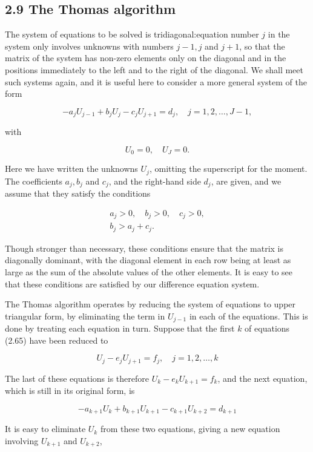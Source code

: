 \documentclass[10pt]{article}
\begin{document}
\subsection*{2.9 The Thomas algorithm}
The system of equations to be solved is tridiagonal:equation number \(j\) in the system only involves unknowns with numbers \(j-1, j\) and \(j+1\), so that the matrix of the system has non-zero elements only on the diagonal and in the positions immediately to the left and to the right of the diagonal. We shall meet such systems again, and it is useful here to consider a more general system of the form

\[
-a_{j} U_{j-1}+b_{j} U_{j}-c_{j} U_{j+1}=d_{j}, \quad j=1,2, \ldots, J-1,
\]

with

\[
U_{0}=0, \quad U_{J}=0 .
\]

Here we have written the unknowns \(U_{j}\), omitting the superscript for the moment. The coefficients \(a_{j}, b_{j}\) and \(c_{j}\), and the right-hand side \(d_{j}\), are given, and we assume that they satisfy the conditions

\[
\begin{gathered}
a_{j}>0, \quad b_{j}>0, \quad c_{j}>0, \\
b_{j}>a_{j}+c_{j} .
\end{gathered}
\]

Though stronger than necessary, these conditions ensure that the matrix is diagonally dominant, with the diagonal element in each row being at least as large as the sum of the absolute values of the other elements. It is easy to see that these conditions are satisfied by our difference equation system.

The Thomas algorithm operates by reducing the system of equations to upper triangular form, by eliminating the term in \(U_{j-1}\) in each of the equations. This is done by treating each equation in turn. Suppose that the first \(k\) of equations (2.65) have been reduced to

\[
U_{j}-e_{j} U_{j+1}=f_{j}, \quad j=1,2, \ldots, k
\]

The last of these equations is therefore \(U_{k}-e_{k} U_{k+1}=f_{k}\), and the next equation, which is still in its original form, is

\[
-a_{k+1} U_{k}+b_{k+1} U_{k+1}-c_{k+1} U_{k+2}=d_{k+1}
\]

It is easy to eliminate \(U_{k}\) from these two equations, giving a new equation involving \(U_{k+1}\) and \(U_{k+2}\),
\end{document}

